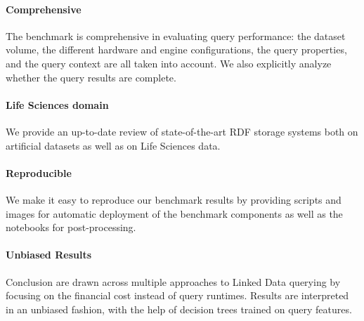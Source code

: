 \paragraph{Comprehensive}
The benchmark is comprehensive in evaluating query performance: the dataset volume, the different hardware and engine configurations, the query properties, and the query context are all taken into account. We also explicitly analyze whether the query results are complete. 

\paragraph{Life Sciences domain}
We provide an up-to-date review of state-of-the-art RDF storage systems both on artificial datasets as well as on Life Sciences data. 


\paragraph{Reproducible}
We make it easy to reproduce our benchmark results by providing scripts and images for automatic deployment of the benchmark components as well as the notebooks for post-processing. 


\paragraph{Unbiased Results}
Conclusion are drawn across multiple approaches to Linked Data querying by focusing on the financial cost instead of query runtimes.
Results are interpreted in an unbiased fashion, with the help of decision trees trained on query features.


